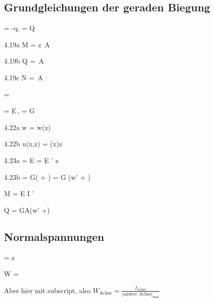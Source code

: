 \documentclass[11pt]{article}
\newcommand{\1}{ {\mathds{1}} }
\newcommand{\abs}[1]{\lvert#1\rvert}
\newcommand{\td}{\,\text{d}}
\begin{document}
\begin{multicols}{3}
		\subsection{Grundgleichungen der geraden Biegung}

		\begin{formel}{4.18}
			 = -q,\quad {} = Q
		\end{formel}
		\begin{formel}{4.19a}
			M = \int z \sigma \td A
		\end{formel}
		\nopagebreak
		\begin{formel}{4.19b}
			Q = \int \tau \td A
		\end{formel}
		\nopagebreak
		\begin{formel}{4.19c}
			N = \int \sigma \td A
		\end{formel}
		\begin{formel}{4.20}
			\epsilon = 
		\end{formel}
		\begin{formel}{4.21}
			\sigma= E\,\epsilon, \quad \tau = G\,\gamma
		\end{formel}
		\begin{formel}{4.22a}
			w = w(x)
		\end{formel}
		\nopagebreak
		\begin{formel}{4.22b}
			u(x,z) = \psi(x)z
		\end{formel}
		\begin{formel}{4.23a}
			\sigma = E = E \psi' z
		\end{formel}
		\nopagebreak
		\begin{formel}{4.23b}
			\tau = G\left(  +  \right) = G (w' + \psi)
		\end{formel}
		\begin{formel}{4.24}
			M = E I \psi'
		\end{formel}
		\begin{formel}{4.25}
			Q = \varkappa GA(w' +\psi)
		\end{formel}

		\subsection{Normalspannungen}

		\begin{formel}{4.26}
			\sigma
			=
			z
		\end{formel}
		\begin{formel}{4.27}
			W
			=
			\frac{I}{\abs{z}_{\text{max}}}
		\end{formel}
		Aber hier mit subscript, also $\displaystyle W_{\text{Achse}} = \frac{I_{\text{Achse}}}{\abs{\text{andere Achse}}_{\text{max}}}$


\end{multicols}
\end{document}
